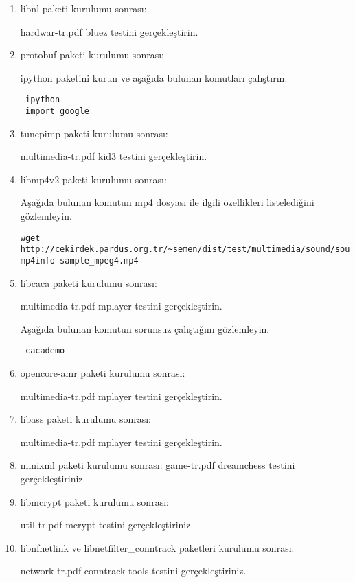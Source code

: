 \documentclass[a4paper,10pt]{article}
\begin{document}
\begin{enumerate}
\item libnl paketi kurulumu sonrası:

hardwar-tr.pdf bluez testini gerçekleştirin.
\item protobuf paketi kurulumu sonrası:

ipython paketini kurun ve aşağıda bulunan komutları çalıştırın:
\begin{verbatim}
 ipython
 import google
\end{verbatim}
\item tunepimp paketi kurulumu sonrası:

multimedia-tr.pdf kid3 testini gerçekleştirin.

\item libmp4v2 paketi kurulumu sonrası:

Aşağıda bulunan komutun mp4 dosyası ile ilgili özellikleri listelediğini gözlemleyin.
\begin{verbatim}
wget http://cekirdek.pardus.org.tr/~semen/dist/test/multimedia/sound/sound/sample_mpeg4.mp4
mp4info sample_mpeg4.mp4 
\end{verbatim}

\item libcaca paketi kurulumu sonrası:

multimedia-tr.pdf mplayer testini gerçekleştirin.

Aşağıda bulunan komutun sorunsuz çalıştığını gözlemleyin.
\begin{verbatim}
 cacademo
\end{verbatim}

\item opencore-amr paketi kurulumu sonrası:

multimedia-tr.pdf mplayer testini gerçekleştirin.

\item libass paketi kurulumu sonrası:

multimedia-tr.pdf mplayer testini gerçekleştirin.

\item minixml paketi kurulumu sonrası:
game-tr.pdf dreamchess testini gerçekleştiriniz.

\item libmcrypt paketi kurulumu sonrası:

util-tr.pdf mcrypt testini gerçekleştiriniz.

\item libnfnetlink ve libnetfilter\_conntrack paketleri kurulumu sonrası:

network-tr.pdf conntrack-tools testini gerçekleştiriniz.


\end{enumerate}
\end{document}
